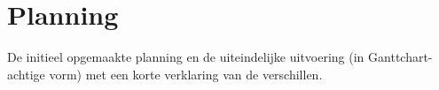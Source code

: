 
\chapter{Planning}

De initieel opgemaakte planning en de uiteindelijke uitvoering (in Ganttchart-achtige
vorm) met een korte verklaring van de verschillen.


